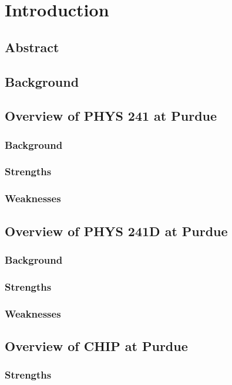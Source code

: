 \chapter[Chapter 1: Introduction]{Introduction}

\section{Abstract}

\section{Background}

\section{Overview of PHYS 241 at Purdue}

\subsection{Background}
\subsection{Strengths}
\subsection{Weaknesses}

\section{Overview of PHYS 241D at Purdue}

\subsection{Background}
\subsection{Strengths}
\subsection{Weaknesses}

\section{Overview of CHIP at Purdue}

\subsection{Strengths}

